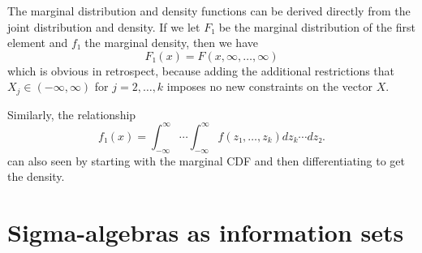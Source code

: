 \begin{itemize}
  The marginal distribution and density functions can be derived
  directly from the joint distribution and density.  If we let $F₁$ be
  the marginal distribution of the first element and $f₁$ the marginal
  density, then we have
  \begin{equation*}
    F₁(x) = F(x, ∞,…,∞)
  \end{equation*}
  which is obvious in retrospect, because adding the additional
  restrictions that $X_j ∈ (-∞, ∞)$ for $j = 2,…,k$ imposes no new
  constraints on the vector $X$.

  Similarly, the relationship
  \begin{equation*}
    f₁(x) = ∫_{-∞}^∞ ⋯ ∫_{-∞}^∞ f(z₁,…,z_k) dz_k ⋯ dz₂.
  \end{equation*}
  can also seen by starting with the marginal CDF and then
  differentiating to get the density.

\end{itemize}

\section{Sigma-algebras as information sets}

